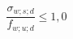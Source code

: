 \documentclass[12pt]{article}
\begin{document}
\begin{displaymath}
\frac {\sigma_{w;s;d}} {f_{w;u;d}} \leq 1,0
\end{displaymath}
\end{document}

